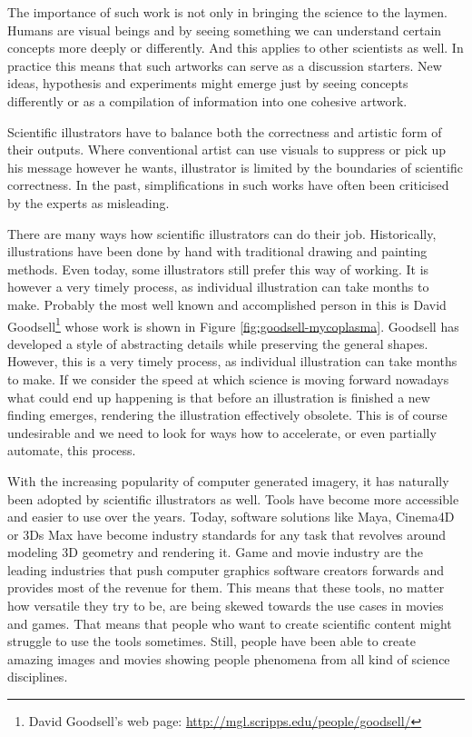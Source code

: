 \documentclass[
  digital, %
  table,   %
  nolof,     %
  nolot,     %
]{fithesis3}
\begin{document}
The importance of such work is not only in bringing the science to the laymen. Humans are visual beings and by seeing something we can understand certain concepts more deeply or differently. And this applies to other scientists as well. In practice this means that such artworks can serve as a discussion starters. New ideas, hypothesis and experiments might emerge just by seeing concepts differently or as a compilation of information into one cohesive artwork.

Scientific illustrators have to balance both the correctness and artistic form of their outputs. Where conventional artist can use visuals to suppress or pick up his message however he wants, illustrator is limited by the boundaries of scientific correctness. In the past, simplifications in such works have often been criticised by the experts as misleading.

There are many ways how scientific illustrators can do their job. Historically, illustrations have been done by hand with traditional drawing and painting methods. Even today, some illustrators still prefer this way of working. It is however a very timely process, as individual illustration can take months to make. Probably the most well known and accomplished person in this is David Goodsell\footnote{
  David Goodsell's web page: \url{http://mgl.scripps.edu/people/goodsell/}
} whose work is shown in Figure \ref{fig:goodsell-mycoplasma}. Goodsell has developed a style of abstracting details while preserving the general shapes. However, this is a very timely process, as individual illustration can take months to make\cite{DavidGoodsellVideo}. If we consider the speed at which science is moving forward nowadays what could end up happening is that before an illustration is finished a new finding emerges, rendering the illustration effectively obsolete. This is of course undesirable and we need to look for ways how to accelerate, or even partially automate, this process.

With the increasing popularity of computer generated imagery, it has naturally been adopted by scientific illustrators as well. Tools have become more accessible and easier to use over the years. Today, software solutions like Maya, Cinema4D or 3Ds Max have become industry standards for any task that revolves around modeling 3D geometry and rendering it. Game and movie industry are the leading industries that push computer graphics software creators forwards and provides most of the revenue for them. This means that these tools, no matter how versatile they try to be, are being skewed towards the use cases in movies and games. That means that people who want to create scientific content might struggle to use the tools sometimes. Still, people have been able to create amazing images and movies showing people phenomena from all kind of science disciplines.
\end{document}
